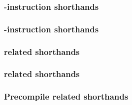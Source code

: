 \subsubsection{-instruction shorthands \lispDone{}}          \label{hub: scenarios: shorthands: call}           
\subsubsection{-instruction shorthands }        \label{hub: scenarios: shorthands: create}          %
\subsubsection{ related shorthands \lispDone{}}            \label{hub: scenarios: shorthands: return}         
\subsubsection{ related shorthands \lispDone{}}      \label{hub: scenarios: shorthands: selfdestruct}   
\subsubsection{Precompile related shorthands \lispDone{}}               \label{hub: scenarios: shorthands: precompile}     
